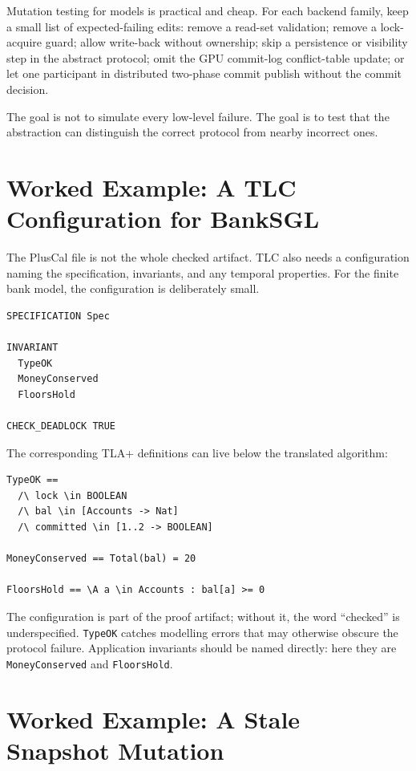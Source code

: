 Mutation testing for models is practical and cheap.  For each backend family,
keep a small list of expected-failing edits: remove a read-set validation;
remove a lock-acquire guard; allow write-back without ownership; skip a
persistence or visibility step in the abstract protocol; omit the GPU
commit-log conflict-table update; or let one participant in distributed
two-phase commit publish without the commit decision.

The goal is not to simulate every low-level failure.  The goal is to test that
the abstraction can distinguish the correct protocol from nearby incorrect
ones.

\section{Worked Example: A TLC Configuration for BankSGL}

The PlusCal file is not the whole checked artifact.  TLC also needs a
configuration naming the specification, invariants, and any temporal properties.
For the finite bank model, the configuration is deliberately small.

\begin{lstlisting}[caption={A minimal TLC configuration for the SGL bank model.}]
SPECIFICATION Spec

INVARIANT
  TypeOK
  MoneyConserved
  FloorsHold

CHECK_DEADLOCK TRUE
\end{lstlisting}

The corresponding TLA+ definitions can live below the translated algorithm:

\begin{lstlisting}[caption={Invariant definitions for the checked bank model.}]
TypeOK ==
  /\ lock \in BOOLEAN
  /\ bal \in [Accounts -> Nat]
  /\ committed \in [1..2 -> BOOLEAN]

MoneyConserved == Total(bal) = 20

FloorsHold == \A a \in Accounts : bal[a] >= 0
\end{lstlisting}

The configuration is part of the proof artifact; without it, the word
``checked'' is underspecified.  \texttt{TypeOK} catches modelling errors that
may otherwise obscure the protocol failure.  Application invariants should be
named directly: here they are \texttt{MoneyConserved} and \texttt{FloorsHold}.

\section{Worked Example: A Stale Snapshot Mutation}

